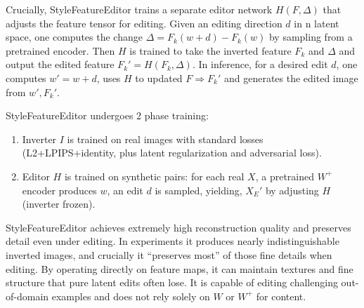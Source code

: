 Crucially, StyleFeatureEditor trains a separate editor network $H(F, \Delta)$ that adjusts the feature tensor for editing. 
Given an editing direction $d$ in n latent space, one computes the change $\Delta  = F_k(w+d) - F_k(w)$ by sampling from a pretrained encoder. 
Then $H$ is trained to take the inverted feature $F_k$ and $\Delta$ and output the edited feature $F_k' = H(F_k, \Delta)$. In inference, for a desired edit 
$d$, one computes $w' = w+d$, uses $H$ to updated $F \Rightarrow F_k'$ and generates the edited image from $w', F_k'$.

StyleFeatureEditor undergoes 2 phase training: 

\begin{enumerate}
    \item Inverter $I$ is trained on real images with standard losses (L2+LPIPS+iden\-tity, plus latent regularization and adversarial loss).
    \item Editor $H$ is  trained on synthetic pairs: for each real $X$, a pretrained $W^+$ encoder produces $w$, an edit $d$ is sampled, yielding, $X_E'$ by adjusting $H$(inverter frozen).
\end{enumerate} 

StyleFeatureEditor achieves extremely high reconstruction quality and preserves detail even under editing. In experiments it produces nearly indistinguishable inverted images, and crucially it “preserves most” of those fine details when editing.
By operating directly on feature maps, it can maintain textures and fine structure that pure latent edits often lose. It is capable of editing challenging out-of-domain examples and does not rely solely on $W$ or $W^+$ for content.
\citep{bobkov2024devildetailsstylefeatureeditordetailrich}
